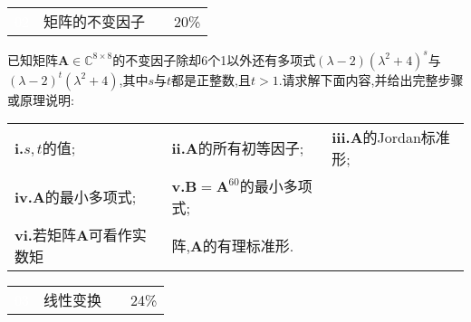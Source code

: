 \documentclass[a4paper]{article}
\newcommand\bsy{\boldsymbol}
\begin{document}
\begin{spacing}{1.5}
\vspace{5mm}
\begin{table}[!ht]
	\renewcommand\arraystretch{2}
	\begin{tabular}{m{1cm}<{\centering}m{12cm}m{2cm}m{1.5cm}<{\centering}}
 \Large\cellcolor{black} \textcolor{white}{\textsf{02}}  & \large \cellcolor{lightgray}\textsf{矩阵的不变因子} & &\cellcolor{lightgray} \large{20\%} \\
\end{tabular}
\end{table}已知矩阵$\bsy{A}\in\mathbb{C}^{8\times8}$的不变因子除却$6$个1以外还有多项式$(\lambda - 2)(\lambda ^2+4)^s$与$(\lambda - 2)^t(\lambda ^2+4)$,其中$s$与$t$都是正整数,且$t>1$.请求解下面内容,并给出完整步骤或原理说明:
\begin{spacing}{1.7}
\begin{tabular}{p{5cm}p{5cm}p{5cm}}
    \textbf{i.}$s,t$的值;&
    \textbf{ii.}$\bsy{A}$的所有初等因子;&
    \textbf{iii.}$\bsy{A}$的Jordan标准形;\\
    \textbf{iv.}$\bsy{A}$的最小多项式;&
    \textbf{v.}$\bsy{B}=\bsy{A}^{60}$的最小多项式;&\\
    \textbf{vi.}若矩阵$\bsy{A}$可看作实数矩&阵,$\bsy{A}$的有理标准形.&\\
\end{tabular}
\end{spacing}
\vspace{20mm}







\vspace{5mm}
\begin{table}[!ht]
	\renewcommand\arraystretch{2}
	\begin{tabular}{m{1cm}<{\centering}m{12cm}m{2cm}m{1.5cm}<{\centering}}
 \Large\cellcolor{black} \textcolor{white}{\textsf{03}}  & \large \cellcolor{lightgray}\textsf{线性变换} & &\cellcolor{lightgray} \large{24\%} \\
\end{tabular}
\end{table}


\end{spacing}
\end{document}
